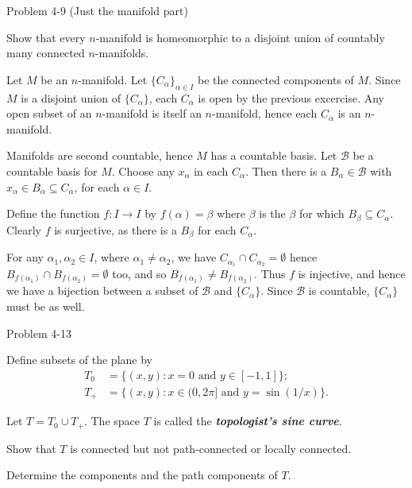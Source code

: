 \documentclass[minion]{homework651}
\newcommand{\nextprob}{\newpage}
\newcommand{\ra}{\rightarrow}
\newcommand{\calB}{\mathcal{B}}
\begin{document}
\begin{aproblems}
\nextprob
\hproblem Problem 4-9 (Just the manifold part)

Show that every $n$-manifold is homeomorphic to a disjoint union of countably
many connected $n$-manifolds.

\solution
Let $M$ be an $n$-manifold.  Let $\{C_\alpha\}_{\alpha\in I}$
be the connected components of
$M$.  Since $M$ is a disjoint union of $\{C_\alpha\}$, each $C_\alpha$ is
open by the previous excercise.  Any open subset of an $n$-manifold is itself
an $n$-manifold, hence each $C_\alpha$ is an $n$-manifold.

Manifolds are second countable, hence $M$ has a countable basis.  Let $\calB$ be
a countable basis for $M$.  Choose any $x_\alpha$ in each $C_\alpha$.  Then
there is a $B_\alpha\in\calB$ with $x_\alpha\in B_\alpha\subseteq C_\alpha$,
for each $\alpha\in I$.

Define the function $f:I\ra I$ by $f(\alpha)=\beta$ where 
$\beta$ is the $\beta$ for which $B_\beta\subseteq C_\alpha$.  Clearly
$f$ is surjective, as there is a $B_\beta$ for each $C_\alpha$.

For any $\alpha_1,\alpha_2 \in I$, where $\alpha_1\ne\alpha_2$,
we have $C_{\alpha_1} \cap C_{\alpha_2} = \emptyset$ hence
$B_{f(\alpha_1)} \cap B_{f(\alpha_2)} = \emptyset$ too,
and so $B_{f(\alpha_1)} \ne B_{f(\alpha_2)}$.
Thus $f$ is injective, and hence we have a bijection between a
subset of $\calB$ and 
$\{C_\alpha\}$.  Since $\calB$ is countable, $\{C_\alpha\}$
must be as well.

\nextprob
\hproblem Problem 4-13

Define subsets of the plane by
\begin{align*}
T_0 &= \{(x,y) : x=0 \text{ and } y\in[-1,1]\}; \\
T_+ &= \{(x,y) : x\in(0,2\pi] \text{ and } y=\sin(1/x)\}.
\end{align*}

Let $T = T_0\cup T_+$.
The space $T$ is called the \textbf{\emph{topologist's sine curve}}.

\begin{subproblems}
\item Show that $T$ is connected but not path-connected or locally connected.
\item Determine the components and the path components of $T$.
\end{subproblems}

\begin{center}
\end{center}


\end{aproblems}
\end{document}

